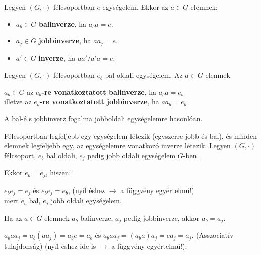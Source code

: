 \begin{frame}
  \begin{tcolorbox}[title={Def.: Balinverz, Jobbinverz, Inverz (Félcsoport)}]
    Legyen $(G, {\cdot})$ félcsoportban $e$ egységelem. Ekkor az $a \in G$ elemnek:\\
    \msmallskip
    
    \begin{itemize}
      \item $a_b \in G$ \textbf{balinverze}, ha $a_ba = e$.
      \item $a_j \in G$ \textbf{jobbinverze}, ha $aa_j = e$.
      \item $a' \in G$ \textbf{inverze}, ha $aa' / a'a = e$.
    \end{itemize}
    \mmedskip
    
    Legyen $(G, {\cdot})$ félcsoportban $e_b$ bal oldali egységelem. Az $a \in G$ elemnek \\
    \msmallskip
    
    $a_b \in G$ az \textbf{$e_b$-re vonatkoztatott balinverze}, ha $a_ba = e_b$\\
    illetve az \textbf{$e_b$-re vonatkoztatott jobbinverze}, ha $aa_b = e_b$\\
    \mmedskip
    
    A bal-é s jobbinverz fogalma jobboldali egységelemre hasonlóan.
  \end{tcolorbox}
\end{frame}


\begin{frame}
  \begin{tcolorbox}[title={Tétel: Egységelem és inverz félcsoportban}]
    Félcsoportban legfeljebb egy egységelem létezik (egyszerre jobb és bal), és minden elemnek legfeljebb egy, az egységelemre vonatkozó inverze létezik.
  \tcblower
    Legyen $(G, {\cdot})$ félcsoport, $e_b$ bal oldali, $e_j$ pedig jobb oldali egységelem $G$-ben.\\
    \msmallskip
    
    Ekkor $e_b = e_j$, hiszen:\\
    \msmallskip
    
    $e_be_j = e_j$ és $e_be_j = e_b$, (nyíl éshez $\rightarrow$ a függvény egyértelmű!)\\
    mert $e_b$ bal, $e_j$ jobb oldali egységelem.\\
    \msmallskip
    
    Ha az $a \in G$ elemnek $a_b$ balinverze, $a_j$ pedig jobbinverze, akkor $a_b = a_j$.\\
    \msmallskip
    
    $a_baa_j = a_b(aa_j) = a_be = a_b$ és $a_baa_j = (a_ba)a_j = ea_j = a_j$. (Asszociatív tulajdonság) (nyíl éshez ide is $\rightarrow$ a függvény egyértelmű!).
  \end{tcolorbox}
\end{frame}

